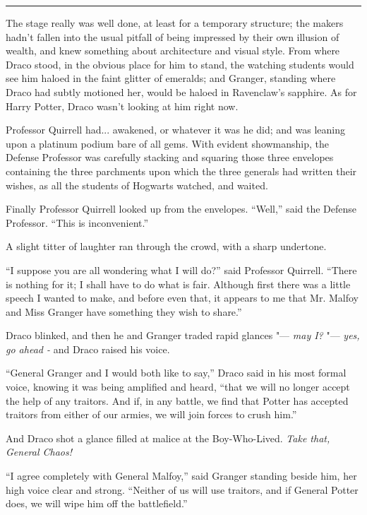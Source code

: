 \begin{center}\rule{3in}{0.4pt}\end{center}

The stage really was well done, at least for a temporary structure; the
makers hadn't fallen into the usual pitfall of being impressed by their
own illusion of wealth, and knew something about architecture and visual
style. From where Draco stood, in the obvious place for him to stand,
the watching students would see him haloed in the faint glitter of
emeralds; and Granger, standing where Draco had subtly motioned her,
would be haloed in Ravenclaw's sapphire. As for Harry Potter, Draco
wasn't looking at him right now.

Professor Quirrell had... awakened, or whatever it was he did; and
was leaning upon a platinum podium bare of all gems. With evident
showmanship, the Defense Professor was carefully stacking and squaring
those three envelopes containing the three parchments upon which the
three generals had written their wishes, as all the students of Hogwarts
watched, and waited.

Finally Professor Quirrell looked up from the envelopes. ``Well,'' said
the Defense Professor. ``This is inconvenient.''

A slight titter of laughter ran through the crowd, with a sharp
undertone.

``I suppose you are all wondering what I will do?'' said Professor
Quirrell. ``There is nothing for it; I shall have to do what is fair.
Although first there was a little speech I wanted to make, and before
even that, it appears to me that Mr. Malfoy and Miss Granger have
something they wish to share.''

Draco blinked, and then he and Granger traded rapid glances "--- \emph{may
I?} "--- \emph{yes, go ahead -} and Draco raised his voice.

``General Granger and I would both like to say,'' Draco said in his most
formal voice, knowing it was being amplified and heard, ``that we will
no longer accept the help of any traitors. And if, in any battle, we
find that Potter has accepted traitors from either of our armies, we
will join forces to crush him.''

And Draco shot a glance filled at malice at the Boy-Who-Lived.
\emph{Take that, General Chaos!}

``I agree completely with General Malfoy,'' said Granger standing beside
him, her high voice clear and strong. ``Neither of us will use traitors,
and if General Potter does, we will wipe him off the battlefield.''

